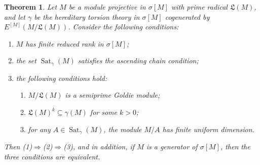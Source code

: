 \documentclass{amsart}
\newtheorem{thm}{Theorem}[section]
\theoremstyle{definition}
\theoremstyle{remark}
\numberwithin{equation}{section}
\DeclareMathOperator{\Sat}{Sat}
\newcommand{\sm}{\sigma[M]}
\begin{document}
	\begin{thm}\label{rrt}
		Let $M$ be a module projective in $\sm$ with prime radical $\mathfrak{L}(M)$,
		and let $\gamma$ be the hereditary torsion theory in $\sm$ 
		cogenerated by $E^{[M]}(M/\mathfrak{L}(M))$. 
		Consider the following conditions:
		\begin{enumerate}
			\item $M$ has finite reduced rank in $\sm$;
			\item the set $\Sat_\gamma(M)$ satisfies the ascending chain condition;
			\item the following conditions hold:
			\begin{enumerate}[label=(\roman*)]
				\item $M/\mathfrak{L}(M)$ is a semiprime Goldie module;
				\item $\mathfrak{L}(M)^k\subseteq \gamma(M)$ for some $k>0$;
				\item for any $A\in\Sat_\gamma(M)$, 
				the module $M/A$ has finite uniform dimension.
			\end{enumerate}
		\end{enumerate}
		Then \textit{(1)}$\Rightarrow$\textit{(2)}$\Rightarrow$\textit{(3)}, 
		and in addition, if $M$ is a generator of $\sm$, 
		then the three conditions are equivalent.
	\end{thm}
	
\end{document}
